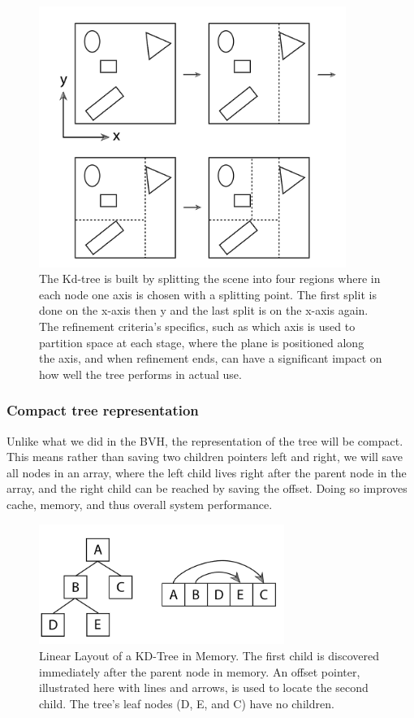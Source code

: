 \documentclass[11pt,a4paper]{article}
\begin{document}
\begin{figure}[h]	
     \centering
         \includegraphics[width=10cm]{images/kdtree/example_demo.png}
        \caption{The Kd-tree is built by splitting the scene into four regions where in each node one axis is chosen with a splitting point.  The first split is done on the x-axis then y and the last split is on the x-axis again. The refinement criteria's specifics, such as which axis is used to partition space at each stage, where the plane is positioned along the axis, and when refinement ends, can have a significant impact on how well the tree performs in actual use. \protect\cite{Pharr2016}}
        \label{fig:dice}
\end{figure}



\subsubsection{Compact tree representation}
Unlike what we did in the BVH, the representation of the tree will be compact. This means rather than saving two children pointers left and right, we will save all nodes in an array, where the left child lives right after the parent node in the array, and the right child can be reached by saving the offset. Doing so improves cache, memory, and thus overall system performance.


\begin{figure}[h]	
     \centering
         \includegraphics[width=8cm]{images/kdtree/compact.png}
        \caption{Linear Layout of a KD-Tree in Memory. The  first child is discovered immediately after the parent node in memory. An offset pointer, illustrated here with lines and arrows, is used to locate the second child. The tree's leaf nodes (D, E, and C) have no children.\protect\cite{Pharr2016}}
        \label{fig:dice}
\end{figure}
\end{document}
